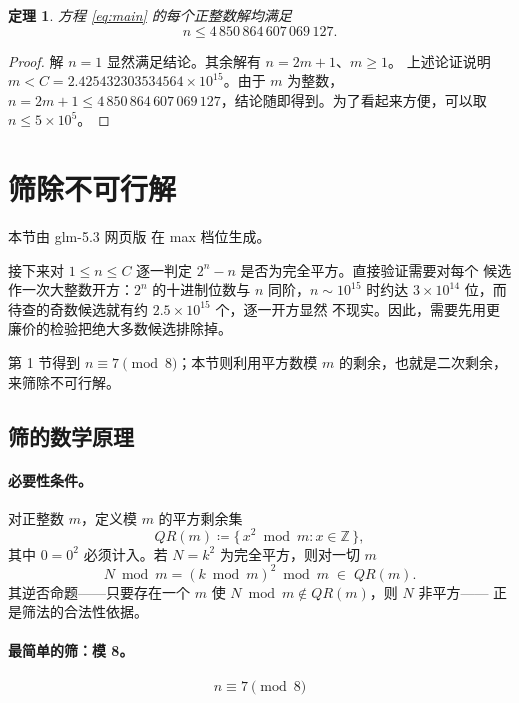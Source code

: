 \documentclass[11pt,a4paper]{ctexart}
\newtheorem{theorem}{定理}
\theoremstyle{remark}
\begin{document}
\begin{theorem}\label{thm:bound}
方程 \eqref{eq:main} 的每个正整数解均满足
\[ \boxed{n\le 4\,850\,864\,607\,069\,127}. \]
\end{theorem}

\begin{proof}
解 \(n=1\) 显然满足结论。其余解有 \(n=2m+1\)、\(m\ge1\)。
上述论证说明 \(m<C=2.425432303534564\times10^{15}\)。由于 \(m\) 为整数，
\(n=2m+1\le 4\,850\,864\,607\,069\,127\)，结论随即得到。为了看起来方便，可以取 $n\le 5\times 10^5$。
\end{proof}

\section{筛除不可行解}
本节由 glm-5.3 网页版 在 max 档位生成。

接下来对 $1\le n\le C$ 逐一判定 $2^n-n$ 是否为完全平方。直接验证需要对每个
候选作一次大整数开方：$2^n$ 的十进制位数与 $n$ 同阶，$n\sim10^{15}$ 时约达
$3\times10^{14}$ 位，而待查的奇数候选就有约 $2.5\times10^{15}$ 个，逐一开方显然
不现实。因此，需要先用更廉价的检验把绝大多数候选排除掉。

第 1 节得到 $n\equiv 7 \pmod 8$；本节则利用平方数模 $m$ 的剩余，也就是二次剩余，来筛除不可行解。

\subsection{筛的数学原理}

\paragraph{必要性条件。} 对正整数 $m$，定义模 $m$ 的平方剩余集
\begin{equation}\label{eq:qr-def}
QR(m) \coloneqq \{\, x^2 \bmod m : x \in \mathbb{Z} \,\},
\end{equation}
其中 $0=0^2$ 必须计入。若 $N = k^2$ 为完全平方，则对一切 $m$
\begin{equation}\label{eq:necessity}
N \bmod m = (k \bmod m)^2 \bmod m \;\in\; QR(m).
\end{equation}
其逆否命题——只要存在一个 $m$ 使 $N \bmod m \notin QR(m)$，则 $N$ 非平方——
正是筛法的合法性依据。

\paragraph{最简单的筛：模 8。}
\begin{equation}\label{eq:mod8.1}
n \equiv 7 \pmod 8
\end{equation}
\end{document}
